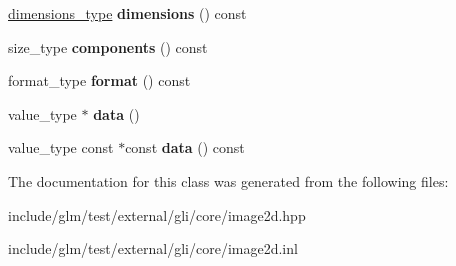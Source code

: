 \begin{DoxyCompactItemize}
\item 
\hypertarget{classgli_1_1image2D_ad155194b18774b144ab58d000ac54b78}{\hyperlink{structglm_1_1detail_1_1tvec2}{dimensions\-\_\-type} {\bfseries dimensions} () const }\label{classgli_1_1image2D_ad155194b18774b144ab58d000ac54b78}

\item 
\hypertarget{classgli_1_1image2D_aa1ca0306b7458a68cdc4861233386a3b}{size\-\_\-type {\bfseries components} () const }\label{classgli_1_1image2D_aa1ca0306b7458a68cdc4861233386a3b}

\item 
\hypertarget{classgli_1_1image2D_a08c2f1ac30dd85cc6b20540234bb6d2d}{format\-\_\-type {\bfseries format} () const }\label{classgli_1_1image2D_a08c2f1ac30dd85cc6b20540234bb6d2d}

\item 
\hypertarget{classgli_1_1image2D_a41d69fc11a0c303ae7303e955ac4186e}{value\-\_\-type $\ast$ {\bfseries data} ()}\label{classgli_1_1image2D_a41d69fc11a0c303ae7303e955ac4186e}

\item 
\hypertarget{classgli_1_1image2D_a7e81e9725da7d55d16d2ec43c24bb1ba}{value\-\_\-type const $\ast$const {\bfseries data} () const }\label{classgli_1_1image2D_a7e81e9725da7d55d16d2ec43c24bb1ba}

\end{DoxyCompactItemize}


\-The documentation for this class was generated from the following files\-:\begin{DoxyCompactItemize}
\item 
include/glm/test/external/gli/core/image2d.\-hpp\item 
include/glm/test/external/gli/core/image2d.\-inl\end{DoxyCompactItemize}
